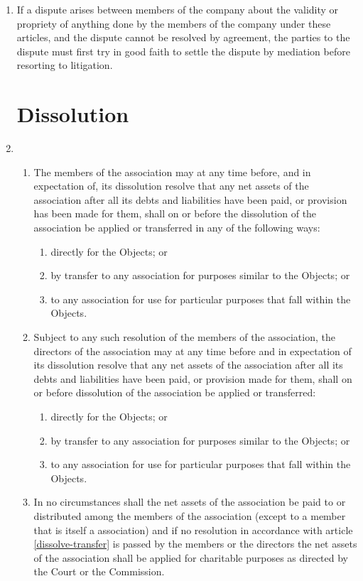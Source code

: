 \begin{enumerate}
\item
    If a dispute arises between members of the company about the validity
    or propriety of anything done by the members of the company under these
    articles, and the dispute cannot be resolved by agreement, the parties
    to the dispute must first try in good faith to settle the dispute by
    mediation before resorting to litigation.

\section{Dissolution}

\item
  \begin{enumerate}
  \item \label{dissolve-transfer}
    The members of the association may at any time before, and in
    expectation of, its dissolution resolve that any net assets of the
    association after all its debts and liabilities have been paid, or
    provision has been made for them, shall on or before the
    dissolution of the association be applied or transferred in any of the
    following ways:
    \begin{enumerate}
    \item
      directly for the Objects; or
    \item
      by transfer to any association for purposes similar to the
      Objects; or
    \item
      to any association for use for particular purposes that
      fall within the Objects.
    \end{enumerate}
  \item
    Subject to any such resolution of the members of the association, the
    directors of the association may at any time before and in expectation
    of its dissolution resolve that any net assets of the association after
    all its debts and liabilities have been paid, or provision made for
    them, shall on or before dissolution of the association be applied or
    transferred:
    \begin{enumerate}
    \item
      directly for the Objects; or
    \item
      by transfer to any association for purposes similar to the
      Objects; or
    \item
      to any association for use for particular purposes that
      fall within the Objects.
    \end{enumerate}
  \item
    In no circumstances shall the net assets of the association be paid to
    or distributed among the members of the association (except to a member
    that is itself a association) and if no resolution in accordance with
    article \ref{dissolve-transfer} is passed by the members or the directors the net
    assets of the association shall be applied for charitable purposes as
    directed by the Court or the Commission.
  \end{enumerate}
\end{enumerate}
